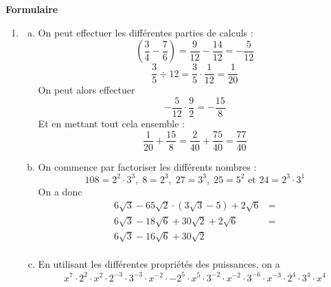 \documentclass[12pt, addpoints]{exam}
\begin{document}
\begin{questions}
\newpage


\newpage

\textbf{Formulaire}


\newpage



\begin{solution}
\begin{enumerate}[1.]
    \item 
            \begin{enumerate}[(a)]
                \item On peut effectuer les différentes parties de calculs :
                $$
                \left(\frac{3}{4}-\frac{7}{6} \right) = \frac{9}{12}-\frac{14}{12} = -\frac{5}{12}
                $$
                $$
                \frac{3}{5}\div 12 = \frac{3}{5}\cdot \frac{1}{12} = \frac{1}{20}
                $$
                On peut alors effectuer
                $$
                -\frac{5}{12}\cdot \frac{9}{2} = -\frac{15}{8}
                $$
                Et en mettant tout cela ensemble :
                $$
                \frac{1}{20}+\frac{15}{8} = \frac{2}{40}+\frac{75}{40} = \frac{77}{40}
                $$
                \item On commence par factoriser les différents nombres :
                $$
                108 = 2^2 \cdot 3^3, \; 8=2^3, \; 27=3^3,\; 25=5^2 \mbox{ et } 24 = 2^3\cdot 3^1
                $$
                On a donc
                \begin{align*}
                    6\sqrt{3} -65\sqrt{2}\cdot \left(3\sqrt{3}-5\right)+2\sqrt{6}&=\\
                    6\sqrt{3}-18\sqrt{6}+30\sqrt{2}+2\sqrt{6}&=\\
                    6\sqrt{3} -16\sqrt{6}+30\sqrt{2}&\\
                \end{align*}
                \item En utilisant les différentes propriétés des puissances, on a 
                $$
                x^7\cdot 2^2 \cdot x^2 \cdot 2^{-3} \cdot 3^{-3} \cdot x^{-2} \cdot -2^5 \cdot x^5 \cdot 3^{-2} \cdot x^{-2} \cdot 3^{-6} \cdot x^{-3} \cdot 2^4 \cdot 3^4 \cdot x^4
$$
\end{enumerate}
\end{enumerate}
\end{solution}
\end{questions}
\end{document}
